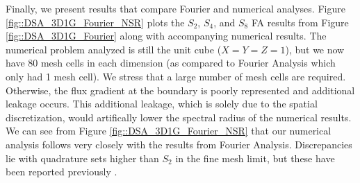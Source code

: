 Finally, we present results that compare Fourier and numerical analyses. Figure \ref{fig::DSA_3D1G_Fourier_NSR} plots the $S_2$, $S_4$, and $S_8$ FA results from Figure \ref{fig::DSA_3D1G_Fourier} along with accompanying numerical results. The numerical problem analyzed is still the unit cube ($X=Y=Z=1$), but we now have 80 mesh cells in each dimension (as compared to Fourier Analysis which only had 1 mesh cell). We stress that a large number of mesh cells are required. Otherwise, the flux gradient at the boundary is poorly represented and additional leakage occurs. This additional leakage, which is solely due to the spatial discretization, would artifically lower the spectral radius of the numerical results. We can see from Figure \ref{fig::DSA_3D1G_Fourier_NSR} that our numerical analysis follows very closely with the results from Fourier Analysis. Discrepancies lie with quadrature sets higher than $S_2$ in the fine mesh limit, but these have been reported previously \cite{ref::DSA_wang_ragusa}.

